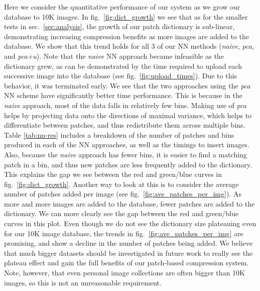 Here we consider the quantitative performance of our system as we grow our database to 10K images.
In fig.~\ref{fig:dict_growth} we see that as for the smaller tests in sec.~\ref{sec:analysis}, the growth of our patch dictionary is sub-linear, demonstrating increasing compression benefits as more images are added to the database. We show that this trend holds for all 3 of our NN methods (\emph{naive}, \emph{pca}, and \emph{pca+u}). Note that the \emph{naive} NN approach became infeasible as the dictionary grew, as can be demonstrated by the time required to upload each successive image into the database (see fig.~\ref{fig:upload_times}). Due to this behavior, it was terminated early. We see that the two approaches using the \emph{pca} NN scheme have significantly better time performance. This is because in the \emph{naive} approach, most of the data falls in relatively few bins. Making use of \emph{pca} helps by projecting data onto the directions of maximal variance, which helps to differentiate between patches, and thus redistribute them across multiple bins. Table \ref{tab:nn-res} includes a breakdown of the number of patches and bins produced in each of the NN approaches, as well as the timings to insert images. Also, because the \emph{naive} approach has fewer bins, it is easier to find a matching patch in a bin, and thus new patches are less frequently added to the dictionary. This explains the gap we see between the red and green/blue curves in fig.~\ref{fig:dict_growth}. Another way to look at this is to consider the average number of patches added per image (see fig.~\ref{fig:ave_patches_per_img}). As more and more images are added to the database, fewer patches are added to the dictionary. We can more clearly see the gap between the red and green/blue curves in this plot. Even though we do not see the dictionary size plateauing even for our 10K image database, the trends in fig.~\ref{fig:ave_patches_per_img} are promising, and show a decline in the number of patches being added. We believe that much bigger datasets should be investigated in future work to really see the plateau effect and gain the full benefits of our patch-based compression system. Note, however, that even personal image collections are often bigger than 10K images, so this is not an unreasonable requirement.

